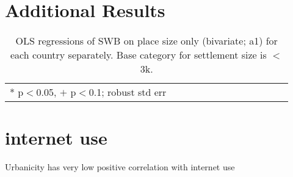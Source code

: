 \documentclass[10pt, letterpaper]{article}
\begin{document}
\begin{spacing}{1.4}
\section{Additional Results}



\begin{spacing}{.9} \begin{table}[H]\centering   \begin{scriptsize} \begin{tabular}{p{.5in}p{.5in}p{.5in}p{.5in}p{.5in}p{.5in}p{.5in}p{.5in}p{.5in}p{.5in}p{.5
                                                                      in}p{.5in}p{.5
                                                                      in}}\hline
                                                                      
                                                                      \hline *
                                                                      p$<$0.05,
                                                                      $+$
                                                                      p$<$0.1;
                                                                      robust std
                                                                      err \end{tabular}\end{scriptsize}\caption{\label{d1}OLS
                                                                    regressions
                                                                    of SWB on
                                                                    place size
                                                                    only
                                                                    (bivariate; a1)
                                                                    for each
                                                                    country
                                                                    separately. Base category for settlement size is $<$3k.
                                                                  }\end{table} \end{spacing}


\section{internet use}

Urbanicity has very low positive correlation with internet use


\end{spacing}
\end{document}
